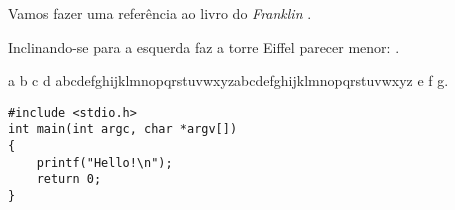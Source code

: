 \documentclass[a5paper]{report}
\begin{document}
Vamos fazer uma referência ao livro do \emph{Franklin} \cite{franklin}.

Inclinando-se para a esquerda faz a torre Eiffel parecer menor: \cite{eerland2011leaning}.

a b c d abcdefghijklmnopqrstuvwxyzabcdefghijklmnopqrstuvwxyz e f g.

\begin{lstlisting}
#include <stdio.h>
int main(int argc, char *argv[])
{
	printf("Hello!\n");
    return 0;
}
\end{lstlisting}

\printindex



\end{document}
